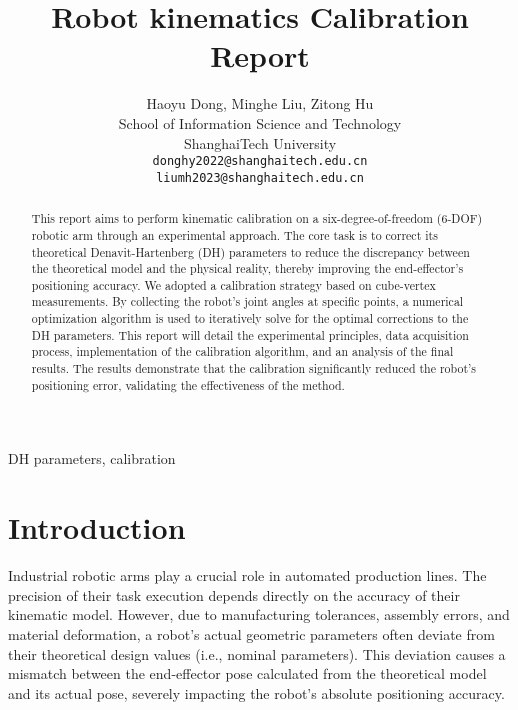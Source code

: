 \documentclass[conference]{IEEEtran}
\begin{document}
\title{Robot kinematics Calibration Report\\

}

\author{Haoyu Dong, Minghe Liu, Zitong Hu\\
	School of Information Science and Technology\\
	ShanghaiTech University\\
	\texttt{donghy2022@shanghaitech.edu.cn} \\
        \texttt{liumh2023@shanghaitech.edu.cn} \\
        
}

\maketitle

\begin{abstract}
This report aims to perform kinematic calibration on a six-degree-of-freedom (6-DOF) robotic arm through an experimental approach. The core task is to correct its theoretical Denavit-Hartenberg (DH) parameters to reduce the discrepancy between the theoretical model and the physical reality, thereby improving the end-effector's positioning accuracy. We adopted a calibration strategy based on cube-vertex measurements. By collecting the robot's joint angles at specific points, a numerical optimization algorithm is used to iteratively solve for the optimal corrections to the DH parameters. This report will detail the experimental principles, data acquisition process, implementation of the calibration algorithm, and an analysis of the final results. The results demonstrate that the calibration significantly reduced the robot's positioning error, validating the effectiveness of the method.
\end{abstract}

\begin{IEEEkeywords}
 DH parameters, calibration
\end{IEEEkeywords}

\section{Introduction}
Industrial robotic arms play a crucial role in automated production lines. The precision of their task execution depends directly on the accuracy of their kinematic model. However, due to manufacturing tolerances, assembly errors, and material deformation, a robot's actual geometric parameters often deviate from their theoretical design values (i.e., nominal parameters). This deviation causes a mismatch between the end-effector pose calculated from the theoretical model and its actual pose, severely impacting the robot's absolute positioning accuracy.
\end{document}
